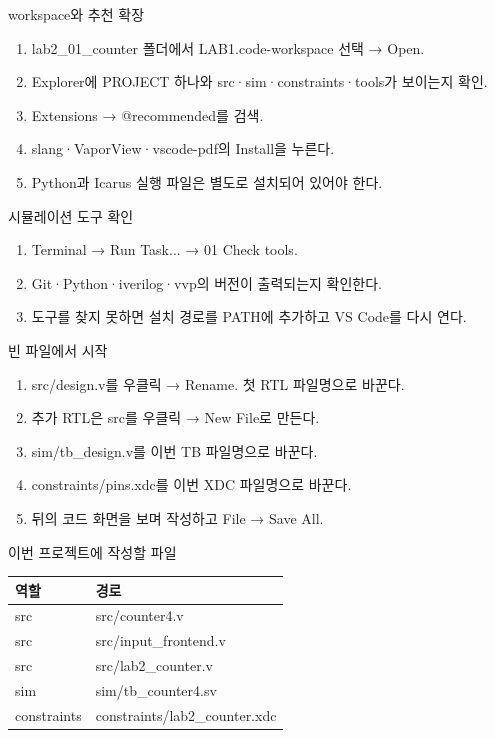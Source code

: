 \begin{frame}{workspace와 추천 확장}
\small
\begin{enumerate}
\item lab2\_01\_counter 폴더에서 LAB1.code-workspace 선택 → Open.
\item Explorer에 PROJECT 하나와 src·sim·constraints·tools가 보이는지 확인.
\item Extensions → @recommended를 검색.
\item slang·VaporView·vscode-pdf의 Install을 누른다.
\item Python과 Icarus 실행 파일은 별도로 설치되어 있어야 한다.
\end{enumerate}
\end{frame}

\begin{frame}{시뮬레이션 도구 확인}
\small
\begin{enumerate}
\item Terminal → Run Task... → 01 Check tools.
\item Git·Python·iverilog·vvp의 버전이 출력되는지 확인한다.
\item 도구를 찾지 못하면 설치 경로를 PATH에 추가하고 VS Code를 다시 연다.
\end{enumerate}
\end{frame}

\begin{frame}{빈 파일에서 시작}
\small
\begin{enumerate}
\item src/design.v를 우클릭 → Rename. 첫 RTL 파일명으로 바꾼다.
\item 추가 RTL은 src를 우클릭 → New File로 만든다.
\item sim/tb\_design.v를 이번 TB 파일명으로 바꾼다.
\item constraints/pins.xdc를 이번 XDC 파일명으로 바꾼다.
\item 뒤의 코드 화면을 보며 작성하고 File → Save All.
\end{enumerate}
\end{frame}

\begin{frame}{이번 프로젝트에 작성할 파일}
\small
\begin{center}\renewcommand{\arraystretch}{1.55}\begin{tabular}{ll}
역할 & 경로\\\hline
src & src/counter4.v\\
src & src/input\_frontend.v\\
src & src/lab2\_counter.v\\
sim & sim/tb\_counter4.sv\\
constraints & constraints/lab2\_counter.xdc\\
\end{tabular}\end{center}
\end{frame}

